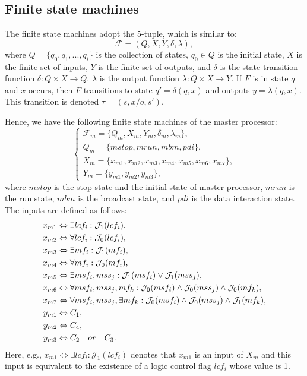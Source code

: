 \documentclass[journal,UTF8]{IEEEtran}
\begin{document}
	\subsection{Finite state machines}
	The finite state machines adopt the 5-tuple, which is similar to\cite{Hierons2016Parallel}:
	\begin{equation}
	\mathcal{F} = (Q, X, Y, \delta, \lambda),
	\end{equation}
	where $Q = \{q_0, q_1,..., q_i\}$ is the collection of states, $q_0 \in Q$ is the initial state, $X$ is the finite set of inputs, $Y$ is the finite set of outputs, and $\delta$ is the state transition function $\delta: Q\times X \rightarrow Q$. $\lambda$ is the output function $\lambda: Q\times X\rightarrow Y$. If $F$ is in state $q$ and $x$ occurs, then $F$ transitions to state $q' = \delta(q, x)$ and outputs $y = \lambda(q, x)$. This transition is denoted $\tau = (s,x/o,s')$.
	
	Hence, we have the following finite state machines of the master processor:
	\begin{equation}
	\label{FMaster}
	\left\{
	\begin{array}{l}
	\mathcal{F}_{m} = \{Q_m, X_m, Y_m,\delta_m, \lambda_m\},\\
	Q_m = \{mstop, mrun, mbm, pdi\},\\
	X_m = \{x_{m1}, x_{m2}, x_{m3}, x_{m4}, x_{m5}, x_{m6}, x_{m7}\},\\
	Y_m = \{y_{m1}, y_{m2}, y_{m3}\},
	\end{array}
	\right.
	\end{equation}
	where $mstop$ is the stop state and the initial state of master processor, $mrun$ is the run state, $mbm$ is the broadcast state, and $pdi$ is the data interaction state. The inputs are defined as follows:
	\begin{align}
	\notag x_{m1}&\Leftrightarrow \exists lcf_i: \mathcal{J}_1(lcf_i),\\
	\notag x_{m2}&\Leftrightarrow  \forall lcf_i: \mathcal{J}_0(lcf_i),\\
	\notag x_{m3}&\Leftrightarrow \exists mf_i: \mathcal{J}_1(mf_i),\\
	\notag x_{m4}&\Leftrightarrow \forall mf_i: \mathcal{J}_0(mf_i),\\
	\notag x_{m5}&\Leftrightarrow \exists msf_i, mss_j: \mathcal{J}_1(msf_i) \lor \mathcal{J}_1(mss_j),\\
	\notag x_{m6}&\Leftrightarrow \forall msf_i, mss_j, mf_k: \mathcal{J}_0(msf_i) \land \mathcal{J}_0(mss_j) \land \mathcal{J}_0(mf_k),\\
	\notag x_{m7}&\Leftrightarrow \forall msf_i, mss_j, \exists mf_k: \mathcal{J}_0(msf_i) \land \mathcal{J}_0(mss_j) \land \mathcal{J}_1(mf_k),\\
	\notag y_{m1}&\Leftrightarrow C_1,\\
	\notag y_{m2}&\Leftrightarrow C_4,\\
	\notag y_{m3}&\Leftrightarrow C_2\quad or\quad C_3.
	\end{align}
	Here, e.g., $x_{m1}\Leftrightarrow \exists lcf_i: \mathcal{J}_1(lcf_i)$ denotes that $x_{m1}$ is an input of $X_m$ and this input is equivalent to the existence of a logic control flag $lcf_i$ whose value is 1.
	
\end{document}
